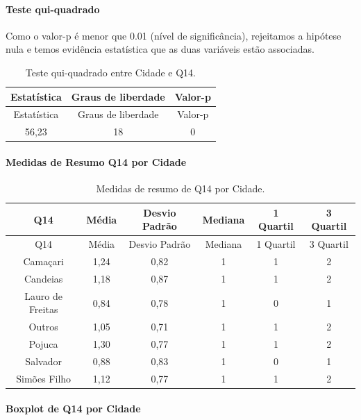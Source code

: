\documentclass[]{article}
\let\oldparagraph\paragraph
\renewcommand{\paragraph}[1]{\oldparagraph{#1}\mbox{}}
\begin{document}
\hypertarget{teste-qui-quadrado-2}{%
\paragraph{Teste qui-quadrado}\label{teste-qui-quadrado-2}}

Como o valor-p é menor que 0.01 (nível de significância), rejeitamos a hipótese nula e temos evidência estatística que as duas variáveis estão associadas.

\begin{longtable}[]{@{}ccc@{}}
\caption{\label{tab:unnamed-chunk-16}Teste qui-quadrado entre Cidade e Q14.}\tabularnewline
\toprule
Estatística & Graus de liberdade & Valor-p\tabularnewline
\midrule
\endfirsthead
\toprule
Estatística & Graus de liberdade & Valor-p\tabularnewline
\midrule
\endhead
56,23 & 18 & 0\tabularnewline
\bottomrule
\end{longtable}

\cleardoublepage

\hypertarget{medidas-de-resumo-q14-por-cidade}{%
\paragraph{Medidas de Resumo Q14 por Cidade}\label{medidas-de-resumo-q14-por-cidade}}

\begin{longtable}[]{@{}cccccc@{}}
\caption{\label{tab:unnamed-chunk-17}Medidas de resumo de Q14 por Cidade.}\tabularnewline
\toprule
Q14 & Média & Desvio Padrão & Mediana & 1 Quartil & 3 Quartil\tabularnewline
\midrule
\endfirsthead
\toprule
Q14 & Média & Desvio Padrão & Mediana & 1 Quartil & 3 Quartil\tabularnewline
\midrule
\endhead
Camaçari & 1,24 & 0,82 & 1 & 1 & 2\tabularnewline
Candeias & 1,18 & 0,87 & 1 & 1 & 2\tabularnewline
Lauro de Freitas & 0,84 & 0,78 & 1 & 0 & 1\tabularnewline
Outros & 1,05 & 0,71 & 1 & 1 & 2\tabularnewline
Pojuca & 1,30 & 0,77 & 1 & 1 & 2\tabularnewline
Salvador & 0,88 & 0,83 & 1 & 0 & 1\tabularnewline
Simões Filho & 1,12 & 0,77 & 1 & 1 & 2\tabularnewline
\bottomrule
\end{longtable}

\hypertarget{boxplot-de-q14-por-cidade}{%
\paragraph{Boxplot de Q14 por Cidade}\label{boxplot-de-q14-por-cidade}}
\end{document}
